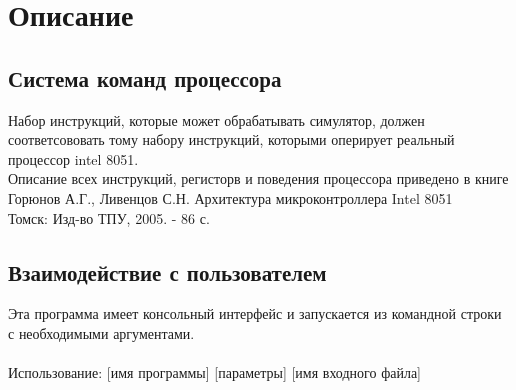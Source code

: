 \section{Описание}

\subsection{Система команд процессора}
Набор инструкций, которые может обрабатывать симулятор, должен соответсововать тому набору инструкций, которыми оперирует реальный процессор intel 8051.\\
Описание всех инструкций, регисторв и поведения процессора приведено в книге \\[5mm]
Горюнов А.Г., Ливенцов С.Н. Архитектура микроконтроллера Intel 8051 \\
Томск: Изд-во ТПУ, 2005. - 86 с. \\

\subsection{Взаимодействие с пользователем}
Эта программа имеет консольный интерфейс и запускается из командной строки с необходимыми аргументами.\\
~\\
Использование:
[имя программы] [параметры] [имя входного файла] \\

